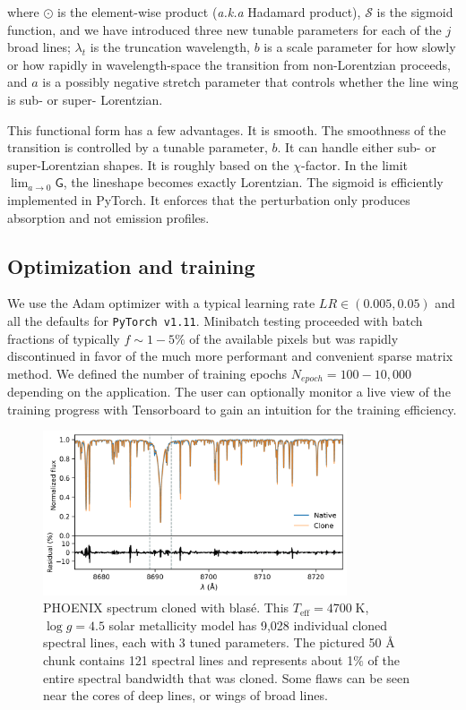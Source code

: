\documentclass[modern]{aastex631}
\begin{document}
where $\odot$ is the element-wise product (\emph{a.k.a} Hadamard product), $\mathcal{S}$ is the sigmoid function, and we have introduced three new tunable parameters for each of the $j$ broad lines; $\lambda_t$ is the truncation wavelength, $b$ is a scale parameter for how slowly or how rapidly in wavelength-space the transition from non-Lorentzian proceeds, and $a$ is a possibly negative stretch parameter that controls whether the line wing is sub- or super- Lorentzian.

This functional form has a few advantages. It is smooth. The smoothness of the transition is controlled by a tunable parameter, $b$. It can handle either sub- or super-Lorentzian shapes. It is roughly based on the $\chi$-factor. In the limit $\lim_{a\to0} \mathsf{G}$, the lineshape becomes exactly Lorentzian. The sigmoid is efficiently implemented in PyTorch.
It enforces that the perturbation only produces absorption and not emission profiles.




\subsection{Optimization and training}

We use the Adam optimizer \citep{2014arXiv1412.6980K} with a typical learning rate $LR\in (0.005, 0.05)$ and all the defaults for \texttt{PyTorch v1.11}. Minibatch testing proceeded with batch fractions of typically $f\sim1-5\%$ of the available pixels but was rapidly discontinued in favor of the much more performant and convenient sparse matrix method. We defined the number of training epochs $N_{epoch}=100-10,000$ depending on the application. The user can optionally monitor a live view of the training progress with Tensorboard to gain an intuition for the training efficiency.


\begin{figure}[hbt!]
    \centering
    \includegraphics[width=0.8\textwidth]{figures/blase_clone_demo.png}
    \caption{PHOENIX spectrum cloned with blas\'e.  This $T_{\mathrm{eff}}=4700\;$K,  $\log{g}=4.5$ solar metallicity model has 9,028 individual cloned spectral lines, each with 3 tuned parameters.  The pictured 50 \AA~ chunk contains 121 spectral lines and represents about 1$\%$ of the entire spectral bandwidth that was cloned.  Some flaws can be seen near the cores of deep lines, or wings of broad lines.}
    \label{fig_cloned_spectrum_demo}
\end{figure}
\end{document}
